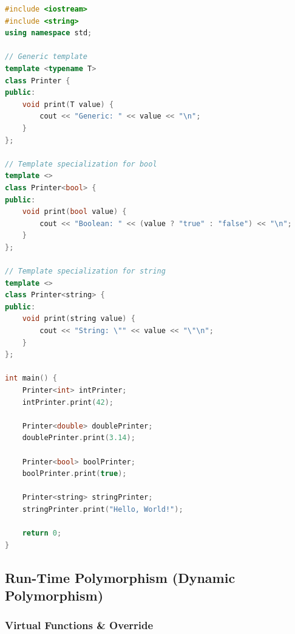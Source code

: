 \begin{lstlisting}[language={C++}]
#include <iostream>
#include <string>
using namespace std;

// Generic template
template <typename T>
class Printer {
public:
    void print(T value) {
        cout << "Generic: " << value << "\n";
    }
};

// Template specialization for bool
template <>
class Printer<bool> {
public:
    void print(bool value) {
        cout << "Boolean: " << (value ? "true" : "false") << "\n";
    }
};

// Template specialization for string
template <>
class Printer<string> {
public:
    void print(string value) {
        cout << "String: \"" << value << "\"\n";
    }
};

int main() {
    Printer<int> intPrinter;
    intPrinter.print(42);
    
    Printer<double> doublePrinter;
    doublePrinter.print(3.14);
    
    Printer<bool> boolPrinter;
    boolPrinter.print(true);
    
    Printer<string> stringPrinter;
    stringPrinter.print("Hello, World!");
    
    return 0;
}
\end{lstlisting}

\hypertarget{run-time-polymorphism-dynamic-polymorphism}{%
\subsection{Run-Time Polymorphism (Dynamic
Polymorphism)}\label{run-time-polymorphism-dynamic-polymorphism}}

\hypertarget{virtual-functions-override}{%
\subsubsection{Virtual Functions \&
Override}\label{virtual-functions-override}}

